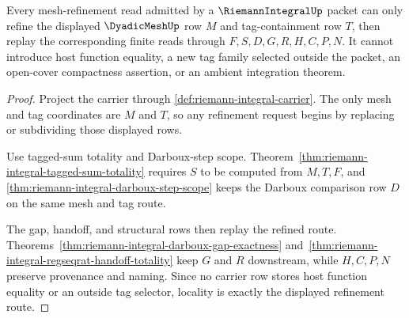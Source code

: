 \begin{theorem}
\label{thm:riemann-integral-mesh-refinement-locality}
Every mesh-refinement read admitted by a $\RiemannIntegralUp$ packet can only refine the displayed $\DyadicMeshUp$ row $M$ and tag-containment row $T$, then replay the corresponding finite reads through $F,S,D,G,R,H,C,P,N$. It cannot introduce host function equality, a new tag family selected outside the packet, an open-cover compactness assertion, or an ambient integration theorem.
\end{theorem}
\begin{proof}
Project the carrier through \autoref{def:riemann-integral-carrier}. The only mesh and tag coordinates are $M$ and $T$, so any refinement request begins by replacing or subdividing those displayed rows.

Use tagged-sum totality and Darboux-step scope. Theorem~\ref{thm:riemann-integral-tagged-sum-totality} requires $S$ to be computed from $M,T,F$, and \autoref{thm:riemann-integral-darboux-step-scope} keeps the Darboux comparison row $D$ on the same mesh and tag route.

The gap, handoff, and structural rows then replay the refined route. Theorems~\ref{thm:riemann-integral-darboux-gap-exactness} and~\ref{thm:riemann-integral-regseqrat-handoff-totality} keep $G$ and $R$ downstream, while $H,C,P,N$ preserve provenance and naming. Since no carrier row stores host function equality or an outside tag selector, locality is exactly the displayed refinement route.
\end{proof}

